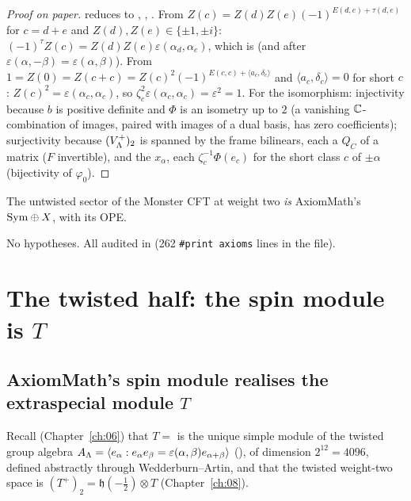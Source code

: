 \begin{proof}[Proof on paper]
 reduces to , , .  From
$Z(c)=Z(d)Z(e)(-1)^{E(d,e)+\tau(d,e)}$ for $c=d+e$ and $Z(d),Z(e)\in\{\pm1,\pm i\}$:
$(-1)^{\tau}Z(c)=Z(d)Z(e)\varepsilon(\alpha_d,\alpha_e)$, which is  (and 
after $\varepsilon(\alpha,-\beta)=\varepsilon(\alpha,\beta)$).  From $1=Z(0)=Z(c+c)=Z(c)^2(-1)^{E(c,c)+\langle a_c,\delta_c\rangle}$ and
$\langle a_c,\delta_c\rangle=0$ for short $c$: $Z(c)^2=\varepsilon(\alpha_c,\alpha_c)$, so
$\zeta_c^2\varepsilon(\alpha_c,\alpha_c)=\varepsilon^2=1$.  For the isomorphism: injectivity because $b$ is
positive definite and $\Phi$ is an isometry up to $2$ (a vanishing ${\mathbb{C}}$-combination of images, paired
with images of a dual basis, has zero coefficients); surjectivity because $(V_{\Lambda}^+)_2$ is spanned
by the frame bilinears, each a $Q_C$ of a matrix ($F$ invertible), and the $x_\alpha$, each
$\zeta_c^{-1}\Phi(e_c)$ for the short class $c$ of $\pm\alpha$ (bijectivity of $\varphi_0$).
\end{proof}
\begin{physics}
The untwisted sector of the Monster CFT at weight two \emph{is} AxiomMath's $\mathrm{Sym}\oplus X$, with its
OPE.
\end{physics}
\begin{status}
No hypotheses.  All audited in  (262 \texttt{\#print axioms}
lines in the file).
\end{status}

\section{The twisted half: the spin module is \texorpdfstring{$T$}{T}}\label{ch21:sec:twisted}

\subsection{AxiomMath's spin module realises the extraspecial module \texorpdfstring{$T$}{T}}

Recall (Chapter~\ref{ch:06}) that $T=$  is the unique simple module of the twisted
group algebra $A_{\Lambda}=\langle e_\alpha: e_\alpha e_\beta=\varepsilon(\alpha,\beta)e_{\alpha+\beta}\rangle$
(), of dimension $2^{12}=4096$, defined abstractly through Wedderburn--Artin,
and that the twisted weight-two space is $(T^+)_2=\mathfrak h(-\tfrac12)\otimes T$ (Chapter~\ref{ch:08}).

